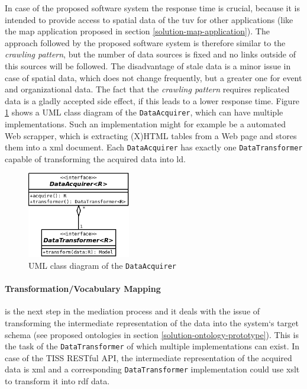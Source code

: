 \documentclass[draft,final]{vutinfth} %
\begin{document}
In case of the proposed software system the response time is crucial, because it is intended to provide access to spatial data of the \gls{tuv} for other applications (like the map application proposed in section \ref{solution-map-application}). The approach followed by the proposed software system is therefore similar to the \textit{crawling pattern}, but the number of data sources is fixed and no links outside of this sources will be followed. The disadvantage of stale data is a minor issue in case of spatial data, which does not change frequently, but a greater one for event and organizational data. The fact that the \textit{crawling pattern} requires replicated data is a gladly accepted side effect, if this leads to a lower response time. Figure \ref{fig:solution-architectural-prototype:acquirer-uml-class-dia} shows a UML class diagram of the \texttt{DataAcquirer}, which can have multiple implementations. Such an implementation might for example be a automated Web scrapper, which is extracting (X)HTML tables from a Web page and stores them into a \gls{xml} document. Each \texttt{DataAcquirer} has exactly one \texttt{DataTransformer} capable of transforming the acquired data into \gls{ld}.

\begin{figure}[h]
    \centering
    \includegraphics[width=0.4\textwidth]{graphics/solution/architecture/dataacquirer.png}
    \caption{UML class diagram of the \texttt{DataAcquirer}}
    \label{fig:solution-architectural-prototype:acquirer-uml-class-dia}
\end{figure}

\paragraph{Transformation/Vocabulary Mapping} is the next step in the mediation process and it deals with the issue of transforming the intermediate representation of the data into the system`s target schema (see proposed ontologies in section \ref{solution-ontology-prototype}). This is the task of the \texttt{DataTransformer} of which multiple implementations can exist. In case of the TISS RESTful API, the intermediate representation of the acquired data is \gls{xml} and a corresponding \texttt{DataTransformer} implementation could use \gls{xslt} to transform it into \gls{rdf} data.
\end{document}
